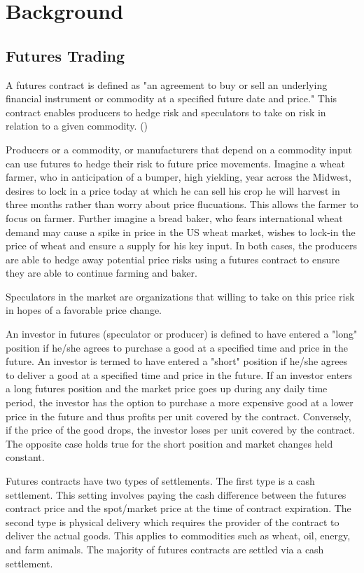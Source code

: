 \documentclass[twoside,11pt]{article}
\begin{document}
\section{Background} \label{background}

\subsection{Futures Trading}
	A futures contract is defined as "an agreement to buy or sell an underlying financial instrument or commodity at a specified future date and price." This contract enables producers to hedge risk and speculators to take on risk in relation to a given commodity. (\cite{InvestopediaF})
	
  Producers or a commodity, or manufacturers that depend on a commodity input can use futures to hedge their risk to future price movements. Imagine a wheat farmer, who in anticipation of a bumper, high yielding, year across the Midwest, desires to lock in a price today at which he can sell his crop he will harvest in three months rather than worry about price flucuations.  This allows the farmer to focus on farmer. Further imagine a bread baker, who fears international wheat demand may cause a spike in price in the US wheat market, wishes to lock-in the price of wheat and ensure a supply for his key input. In both cases, the producers are able to hedge away potential price risks using a futures contract to ensure they are able to continue farming and baker.
  
  Speculators in the market are organizations that willing to take on this price risk in hopes of a favorable price change.

  An investor in futures (speculator or producer) is defined to have entered a "long" position if he/she agrees to purchase a good at a specified time and price in the future. An investor is termed to have entered a "short" position if he/she agrees to deliver a good at a specified time and price in the future. If an investor enters a long futures position and the market price goes up  during any daily time period, the investor has the option to purchase a more expensive good at a lower price in the future and thus profits  per unit covered by the contract. Conversely, if the price of the good drops, the investor loses  per unit covered by the contract. The opposite case holds true for the short position and market changes held constant.
  
  Futures contracts have two types of settlements. The first type is a cash settlement. This setting involves paying the cash difference between the futures contract price and the spot/market price at the time of contract expiration. The second type is physical delivery which requires the provider of the contract to deliver the actual goods. This applies to commodities such as wheat, oil, energy, and farm animals. The majority of futures contracts are settled via a cash settlement.
  
\end{document}
